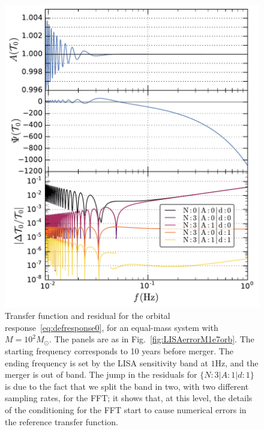 \documentclass[aps,showpacs,twocolumn,
prd,superscriptaddress,nofootinbib]{revtex4-1}
\newcommand{\Msol}{M_{\odot}}
\begin{document}
\begin{figure}
  \centering
  \includegraphics[width=.98\linewidth]{plots/LISAtransfererrorM1e2dO_py.pdf}
  \caption{Transfer function and residual for the orbital response~\eqref{eq:defresponse0}, for an equal-mass system with $M=10^{2} \Msol$. The panels are as in Fig.~\ref{fig:LISAerrorM1e7orb}. The starting frequency corresponds to 10 years before merger. The ending frequency is set by the LISA sensitivity band at $1\mathrm{Hz}$, and the merger is out of band. The jump in the residuals for $\{N:3|A:1|d:1\}$ is due to the fact that we split the band in two, with two different sampling rates, for the FFT; it shows that, at this level, the details of the conditioning for the FFT start to cause numerical errors in the reference transfer function.}
  \label{fig:LISAerrorM1e2orb}
\end{figure}
\end{document}
